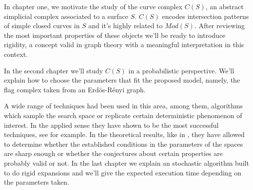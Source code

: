 In chapter one, we motivate the study of the curve complex $C(S)$, an abstract simplicial complex associated to a surface $S$. $C(S)$ encodes intersection patterns of simple closed curves in $S$ and it's highly related to $Mod(S)$. After reviewing the most important properties of these objects we'll be ready to introduce rigidity, a concept valid in graph theory with a meaningful interpretation in this context.

In the second chapter we'll study $C(S)$ in a probabilistic perspective. We'll explain how to choose the parameters that fit the proposed model, namely, the flag complex taken from an Erdös-Rényi graph.

A wide range of techniques had been used in this area, among them, algorithms which sample the search space or replicate certain deterministic phenomenon of interest. In the applied sense they have shown to be the most successful techniques, see \cite{Alcazar15} for example. In the theoretical results, like in \cite{Meshulam13}, they have allowed to determine whether the established conditions in the parameters of the spaces are sharp enough or whether the conjectures about certain properties are probably valid or not. In the last chapter we explain an stochastic algorithm built to do rigid expansions and we'll give the expected execution time depending on the parameters taken.



























